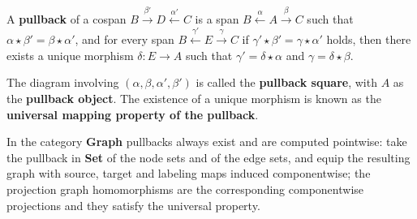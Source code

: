 \begin{definition} 
    \label{def:cat:pb}
   A \textbf{pullback} of a cospan \(B \overset{\beta'}{\rightarrow} D \overset{\alpha'}{\leftarrow} C \)
is a span \( B \overset{\alpha}{\leftarrow} A \overset{\beta}{\rightarrow} C \) such that \( \alpha \star \beta' = \beta \star \alpha' \), and for every span \( B \overset{\gamma'}{\leftarrow} E \overset{\gamma}{\rightarrow} C \) if \(\gamma' \star \beta' = \gamma \star \alpha'\) holds, then there exists a unique morphism \(\delta: E \to A\) such that $\gamma' = \delta \star \alpha$ and $\gamma = \delta \star \beta$. 
    \begin{center}
                \end{center}
The diagram involving \( (\alpha, \beta, \alpha', \beta') \) is called the \textbf{pullback square}, with \(A\) as the \textbf{pullback object}. The existence of a unique morphism is known as the \textbf{universal mapping property of the pullback}.
\end{definition} 
In the category \textbf{Graph} pullbacks always exist and are computed pointwise: take the pullback in \textbf{Set} of the node sets and of the edge sets, and equip the resulting graph with source, target and labeling maps induced componentwise; the projection graph homomorphisms are the corresponding componentwise projections and they satisfy the universal property.
